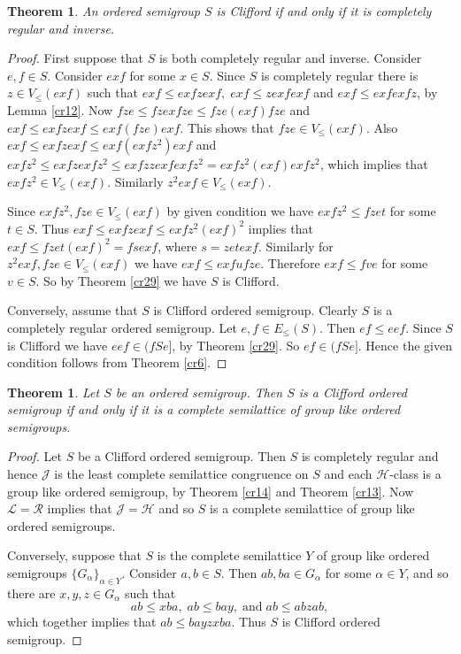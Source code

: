 \documentclass[13pt]{article}
\newtheorem{Theorem}[theorem]{Theorem}
\theoremstyle{definition}
\theoremstyle{remark}
\numberwithin{equation}{section}
\newcommand{\lc}{\mathcal{L}}
\newcommand{\rc}{\mathcal{R}}
\newcommand{\hc}{\mathcal{H}}
\newcommand{\jc}{\mathcal{J}}
\begin{document}
\begin{Theorem}
An ordered semigroup $S$ is Clifford if and only if it is
completely regular and inverse.
\end{Theorem}
\begin{proof}
First suppose that $S$ is both completely regular and inverse. Consider $e, f
\in S$. Consider $exf$ for some $x \in S$. Since $S$ is completely
regular there is  $z \in V_\leq(exf)$ such that  $exf \leq exf z
exf, \;exf \leq zexfexf$ and $exf \leq exfexf z$, by Lemma
\ref{cr12}. Now $fze \leq fzexfze \leq fze(exf)fze$ and $exf \leq
exf z exf \leq exf(fze)exf$. This shows that $fze \in V_\leq(exf)$.
Also $exf \leq exf z exf \leq exf (exf z^2) exf$ and $exfz^2 \leq
exf z exf z^2 \leq exfz zexf exf z^2=exfz^2 (exf) exfz^2$, which
implies that $exfz^2 \in V_\leq(exf)$. Similarly $z^2exf\in
V_\leq(exf)$.

Since  $exfz^2, fze \in V_\leq(exf)$ by given condition we have
$exfz^2\leq fzet $ for some $t \in S$. Thus $exf \leq exf z exf \leq
exf z^2 (exf)^2$ implies that $exf \leq fzet(exf)^2= fsexf$, where
$s=zetexf$. Similarly for $z^2exf, fze\in V_\leq(exf)$ we have $exf
\leq exf ufze$. Therefore $exf \leq fve$ for some $v \in S$. So by
Theorem \ref{cr29} we have $S$ is Clifford.

Conversely, assume that $S$ is Clifford ordered semigroup. Clearly
$S$ is a completely regular ordered semigroup. Let $e,f \in
E_\leq(S)$. Then $ef \leq eef$. Since $S$ is Clifford we have $eef
\in (fSe]$, by Theorem \ref{cr29}. So $ef \in (fSe]$. Hence the
given condition follows from Theorem \ref{cr6}.
\end{proof}

\begin{Theorem}\label{cr28}
Let $S$ be an ordered semigroup. Then $S$ is a Clifford ordered
semigroup if and only if it is a complete semilattice of  group like
ordered semigroups.
\end{Theorem}
\begin{proof}
Let $S$ be a Clifford ordered semigroup. Then $S$ is completely
regular and hence $\jc$ is the least complete semilattice congruence
on $S$ and each  $\hc$-class is a group like ordered semigroup, by
Theorem \ref{cr14} and Theorem \ref{cr13}. Now $\lc = \rc$ implies
that $\jc = \hc$ and so $S$ is a complete semilattice of group like
ordered semigroups.

Conversely, suppose that  $S$ is  the complete semilattice  $Y$ of
group like ordered semigroups $\{G_{\alpha}\}_{\alpha \in Y}$.
Consider $a, b \in S$. Then $ab, ba \in G_{\alpha}$ for some $\alpha
\in Y$, and so there are $x, y, z \in G_{\alpha}$ such that $$ab
\leq xba, \;ab \leq bay, \;\textrm{and} \;ab \leq abzab,$$ which
together implies that $ab \leq bay zxba$. Thus $S$ is Clifford
ordered semigroup.
\end{proof}
\end{document}
